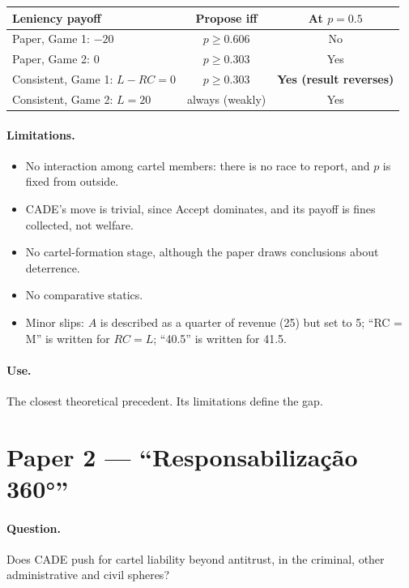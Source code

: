 \documentclass[11pt,a4paper]{article}
\begin{document}
\begin{center}\small
\begin{tabular}{@{}lcc@{}}
\toprule
Leniency payoff & Propose iff & At $p=0.5$ \\
\midrule
Paper, Game 1: $-20$ & $p\ge 0.606$ & No \\
Paper, Game 2: $0$ & $p\ge 0.303$ & Yes \\
Consistent, Game 1: $L-RC=0$ & $p\ge 0.303$ & \textbf{Yes (result reverses)} \\
Consistent, Game 2: $L=20$ & always (weakly) & Yes \\
\bottomrule
\end{tabular}
\end{center}

\paragraph{Limitations.}
\begin{itemize}
\item No interaction among cartel members: there is no race to report, and $p$ is fixed from outside.
\item CADE's move is trivial, since Accept dominates, and its payoff is fines collected, not welfare.
\item No cartel-formation stage, although the paper draws conclusions about deterrence.
\item No comparative statics.
\item Minor slips: $A$ is described as a quarter of revenue (25) but set to 5; ``RC = M'' is written
for $RC=L$; ``40.5'' is written for 41.5.
\end{itemize}

\paragraph{Use.} The closest theoretical precedent. Its limitations define the gap.

\section{Paper 2 --- ``Responsabilização 360°''}

\paragraph{Question.} Does CADE push for cartel liability beyond antitrust, in the criminal, other
administrative and civil spheres?
\end{document}
